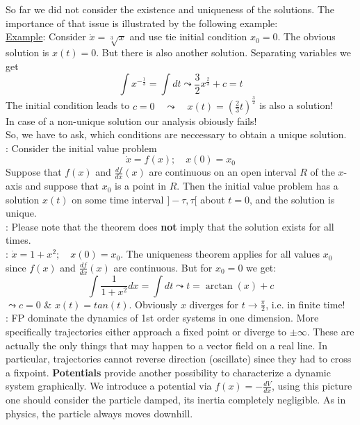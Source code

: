 \noindent So far we did not consider the existence and uniqueness of the solutions. The importance of that issue is illustrated by the following example:\\
\underline{Example}: Consider $\dot{x}=\sqrt[3]{x}$ and use tie initial condition $x_0=0$. The obvious solution is $x(t)=0$. But there is also another solution. Separating variables we get
\begin{equation*}
	\int x^{-\frac{1}{3}}=\int dt \leadsto \frac{3}{2}x^\frac{2}{3}+c=t
\end{equation*}
The initial condition leads to $c=0 \quad \leadsto \quad x(t)=\left(\frac{2}{3}t\right)^\frac{3}{2}$ is also a solution!\\
In case of a non-unique solution our analysis obiously fails!\\
So, we have to ask, which conditions are neccessary to obtain a unique solution.\\
\textbf{\underline{}}: Consider the initial value problem
\begin{equation*}
	\dot{x}=f(x);\quad x(0)=x_0
\end{equation*}
Suppose that $f(x)$ and $\frac{df}{dx}(x)$ are continuous on an open interval $R$ of the $x$-axis and suppose that $x_0$ is a point in $R$. Then the initial value problem has a solution $x(t)$ on some time interval $]-\tau,\tau[$ about $t=0$, and the solution is unique.\\
\underline{}: Please note that the theorem does \textbf{not} imply that the solution exists for all times.\\
\underline{}: $\dot{x}=1+x^2; \quad x(0)=x_0$. The uniqueness theorem applies for all values $x_0$ since $f(x)$ and $\frac{df}{dx}(x)$ are continuous. But for $x_0=0$ we get:
\begin{equation*}
	\int \frac{1}{1+x^2}dx=\int dt \leadsto t=\arctan(x)+c
\end{equation*}
$\leadsto c=0$ \& $x(t)=tan(t)$. Obviously $x$ diverges for $t\to\frac{\pi}{2}$, i.e. in finite time!\\
\underline{}: FP dominate the dynamics of 1st order systems in one dimension. More specifically trajectories either approach a fixed point or diverge to $\pm\infty$. These are actually the only things that may happen to a vector field on a real line. In particular, trajectories cannot reverse direction (oscillate) since they had to cross a fixpoint. \textbf{Potentials} provide another possibility to characterize a dynamic system graphically. We introduce a potential via $f(x)=-\frac{dV}{dx}$, using this picture one should consider the particle damped, its inertia completely negligible. As in physics, the particle always moves downhill.
